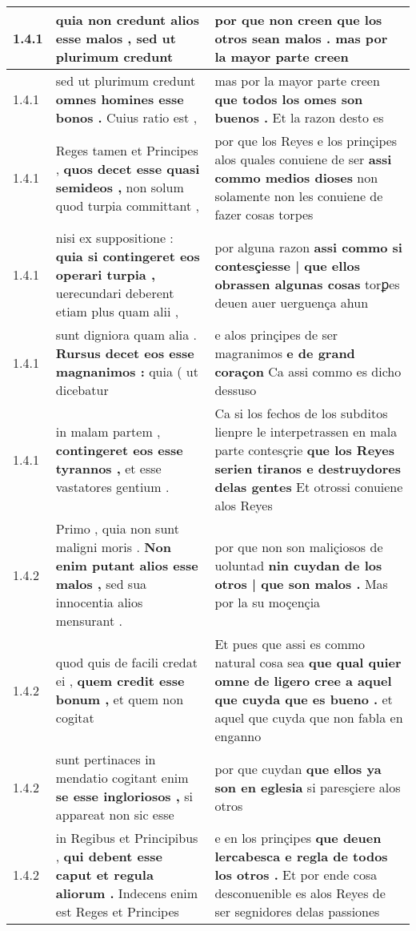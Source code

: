 \begin{tabular}{|p{1cm}|p{6.5cm}|p{6.5cm}|}
1.4.1 & quia non credunt \textbf{ alios esse malos , } sed ut plurimum credunt & por que non creen \textbf{ que los otros sean malos . } mas por la mayor parte creen \\\hline
1.4.1 & sed ut plurimum credunt \textbf{ omnes homines esse bonos . } Cuius ratio est , & mas por la mayor parte creen \textbf{ que todos los omes son buenos . } Et la razon desto es \\\hline
1.4.1 & Reges tamen et Principes , \textbf{ quos decet esse quasi semideos , } non solum quod turpia committant , & por que los Reyes e los prinçipes alos quales conuiene de ser \textbf{ assi commo medios dioses } non solamente non les conuiene de fazer cosas torpes \\\hline
1.4.1 & nisi ex suppositione : \textbf{ quia si contingeret eos operari turpia , } uerecundari deberent etiam plus quam alii , & por alguna razon \textbf{ assi commo si contesçiesse | que ellos obrassen algunas cosas } torꝑes deuen auer uerguença ahun \\\hline
1.4.1 & sunt digniora quam alia . \textbf{ Rursus decet eos esse magnanimos : } quia ( ut dicebatur & e alos prinçipes de ser magranimos \textbf{ e de grand coraçon } Ca assi commo es dicho dessuso \\\hline
1.4.1 & in malam partem , \textbf{ contingeret eos esse tyrannos , } et esse vastatores gentium . & Ca si los fechos de los subditos lienpre le interpetrassen en mala parte contesçrie \textbf{ que los Reyes serien tiranos e destruydores delas gentes } Et otrossi conuiene alos Reyes \\\hline
1.4.2 & Primo , quia non sunt maligni moris . \textbf{ Non enim putant alios esse malos , } sed sua innocentia alios mensurant . & por que non son maliçiosos de uoluntad \textbf{ nin cuydan de los otros | que son malos . } Mas por la su moçençia \\\hline
1.4.2 & quod quis de facili credat ei , \textbf{ quem credit esse bonum , } et quem non cogitat & Et pues que assi es commo natural cosa sea \textbf{ que qual quier omne de ligero cree a aquel que cuyda que es bueno . } et aquel que cuyda que non fabla en enganno \\\hline
1.4.2 & sunt pertinaces in mendatio cogitant enim \textbf{ se esse ingloriosos , } si appareat non sic esse & por que cuydan \textbf{ que ellos ya son en eglesia } si paresçiere alos otros \\\hline
1.4.2 & in Regibus et Principibus , \textbf{ qui debent esse caput et regula aliorum . } Indecens enim est Reges et Principes & e en los prinçipes \textbf{ que deuen lercabesca e regla de todos los otros . } Et por ende cosa desconuenible es alos Reyes de ser segnidores delas passiones \\\hline

\end{tabular}
